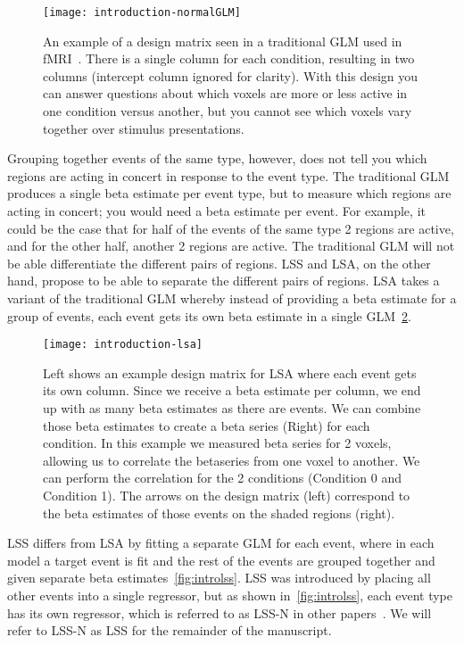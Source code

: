 \documentclass[10pt,letterpaper]{article}
\begin{document}
\begin{figure}[H]
  \centering
  \texttt{[image: introduction-normalGLM]}
  \caption{
    An example of a design matrix seen in a traditional GLM used in fMRI~\cite{Friston1995}.
    There is a single column for each condition, resulting in two columns (intercept column ignored for clarity).
    With this design you can answer questions about which voxels are more or less active in one condition
    versus another, but you cannot see which voxels vary together over stimulus presentations.
  }
  \label{fig:introGLM}
\end{figure}

Grouping together events of the same type, however, does not tell you which regions are acting in concert
in response to the event type.
The traditional GLM produces a single beta estimate per event type, but to measure which regions
are acting in concert; you would need a beta estimate per event.
For example, it could be the case that for half of the events of the same type 2 regions are active,
and for the other half, another 2 regions are active.
The traditional GLM will not be able differentiate the different pairs of regions.
LSS and LSA, on the other hand, propose to be able to separate the different pairs of regions.
LSA takes a variant of the traditional GLM whereby instead of providing a beta
estimate for a group of events, each event gets its own beta estimate in a single GLM~\ref{fig:introlsa}.

\begin{figure}[H]
  \centering
  \texttt{[image: introduction-lsa]}
  \caption{
    Left shows an example design matrix for LSA where each event gets its own column.
    Since we receive a beta estimate per column, we end up with as many beta estimates as there
    are events.
    We can combine those beta estimates to create a beta series (Right) for each condition.
    In this example we measured beta series for 2 voxels, allowing us to
    correlate the betaseries from one voxel to another.
    We can perform the correlation for the 2 conditions (Condition 0 and Condition 1).
    The arrows on the design matrix (left) correspond to the beta estimates of those events
    on the shaded regions (right).
  }
  \label{fig:introlsa}
\end{figure}

LSS differs from LSA by fitting a separate GLM for each event, where in each model a target
event is fit and the rest of the events are grouped together and given separate beta estimates~\ref{fig:introlss}.
LSS was introduced by placing all other events into a single regressor, but as shown in~\ref{fig:introlss},
each event type has its own regressor, which is referred to as LSS-N in other papers~\cite{Rissman2004,Abdulrahman2016,Mumford2012}.
We will refer to LSS-N as LSS for the remainder of the manuscript.
\end{document}
